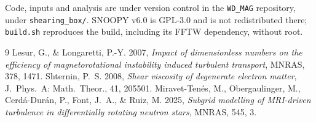 \documentclass[11pt,a4paper]{article}
\begin{document}
\vspace{0.6em}
\noindent
Code, inputs and analysis are under version control in the \texttt{WD\_MAG}
repository, under \texttt{shearing\_box/}. SNOOPY v6.0 is GPL-3.0 and is not
redistributed there; \texttt{build.sh} reproduces the build, including its FFTW
dependency, without root.

\begin{thebibliography}{9}
Lesur, G., \& Longaretti, P.-Y. 2007,
\textit{Impact of dimensionless numbers on the efficiency of
magnetorotational instability induced turbulent transport},
MNRAS, 378, 1471.
Shternin, P.~S. 2008,
\textit{Shear viscosity of degenerate electron matter},
J.\ Phys.\ A: Math.\ Theor., 41, 205501.
Miravet-Ten\'es, M., Obergaulinger, M., Cerd\'a-Dur\'an, P., Font, J.~A., \&
Ruiz, M. 2025, \textit{Subgrid modelling of MRI-driven turbulence in
differentially rotating neutron stars}, MNRAS, 545, 3.
\end{thebibliography}
\end{document}
